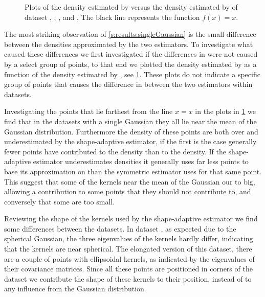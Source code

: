 
\begin{figure}
	\centering
	
	\caption{Plots of the density estimated by \mbe versus the density estimated by \sambe of dataset %
		 \ferdosiOne, %
		 \baakmanOne, %
		 \baakmanFour, and %
		 \baakmanFive, %
	The black line represents the function $f(x) = x$.}
	\label{fig:discussion:singleSphere:mbevssambe}
\end{figure}

		The most striking observation of \cref{s:results:singleGaussian} is the small difference between the densities approximated by the two estimators. To investigate what caused these differences we first investigated if the differences in \mse were not caused by a select group of points, to that end we plotted the density estimated by \sambe as a function of the density estimated by \mbe, see \cref{fig:discussion:singleSphere:mbevssambe}. These plots do not indicate a specific group of points that causes the difference in \MSE between the two estimators within datasets.
		
		Investigating the points that lie farthest from the line $x = x$ in the plots in \cref{fig:discussion:singleSphere:mbevssambe} we find that in the datasets with a single Gaussian they all lie near the mean of the Gaussian distribution. Furthermore the density of these points are both over and underestimated by the shape-adaptive estimator, if the first is the case generally fewer points have contributed to the \mbe density than to the \sambe density. If the shape-adaptive estimator underestimates densities it generally uses far less points to base its approximation on than the symmetric estimator uses for that same point. This suggest that some of the kernels near the mean of the Gaussian our to big, allowing a contribution to some points that they should not contribute to, and conversely that some are too small. 

		Reviewing the shape of the kernels used by the shape-adaptive estimator we find some differences between the datasets. 
			In dataset \ferdosiOne, as expected due to the spherical Gaussian, the three eigenvalues of the kernels hardly differ, indicating that the kernels are near spherical. 
			The elongated version of this dataset, there are a couple of points with ellipsoidal kernels, as indicated by the eigenvalues of their covariance matrices. Since all these points are positioned in corners of the dataset we contribute the shape of these kernels to their position, instead of to any influence from the Gaussian distribution. 
			
